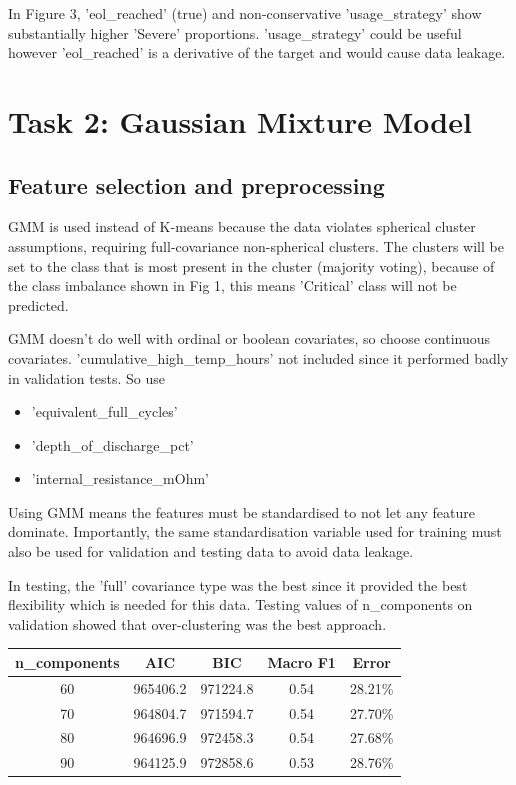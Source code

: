 \documentclass[12pt]{article}
\begin{document}
In Figure 3, 'eol_reached' (true) and non-conservative 'usage_strategy' show substantially higher 'Severe' proportions. 'usage_strategy' could be useful however 'eol_reached' is a derivative of the target and would cause data leakage.

\section{Task 2: Gaussian Mixture Model}

\subsection{Feature selection and preprocessing}

GMM is used instead of K-means because the data violates spherical cluster assumptions, requiring full-covariance non-spherical clusters. The clusters will be set to the class that is most present in the cluster (majority voting), because of the class imbalance shown in Fig 1, this means 'Critical' class will not be predicted.

GMM doesn't do well with ordinal or boolean covariates, so choose continuous covariates. 'cumulative_high_temp_hours' not included since it performed badly in validation tests. So use

\begin{itemize}
    \item 'equivalent_full_cycles'
    \item 'depth_of_discharge_pct'
    \item 'internal_resistance_mOhm'
\end{itemize}

Using GMM means the features must be standardised to not let any feature dominate. Importantly, the same standardisation variable used for training must also be used for validation and testing data to avoid data leakage.

In testing, the 'full' covariance type was the best since it provided the best flexibility which is needed for this data. Testing values of n_components on validation showed that over-clustering was the best approach.

\begin{center}
\begin{tabular}{||c c c c c||} 
 \hline
 n_components & AIC & BIC & Macro F1 & Error\\ [0.5ex] 
 \hline\hline
 60 & 965406.2 & 971224.8 & 0.54 & 28.21\%\\
 \hline
 70 & 964804.7 & 971594.7 & 0.54 & 27.70\%\\
 \hline
 80 & 964696.9 & 972458.3 & 0.54 & 27.68\%\\
 \hline
 90 & 964125.9 & 972858.6 & 0.53 & 28.76\% \\
 \hline
\end{tabular}
\end{center}
\end{document}
